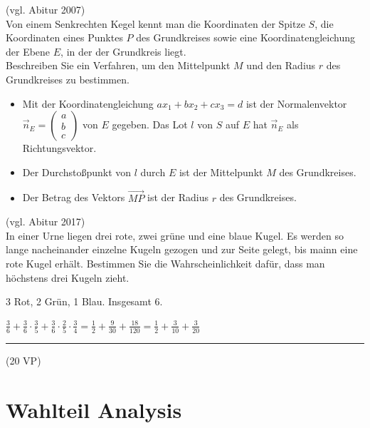  (vgl. Abitur 2007)\\
Von einem Senkrechten Kegel kennt man die Koordinaten der Spitze $S$, die Koordinaten eines Punktes $P$ des Grundkreises sowie eine Koordinatengleichung der Ebene $E$, in der der Grundkreis liegt.
\\Beschreiben Sie ein Verfahren, um den Mittelpunkt $M$ und den Radius $r$ des Grundkreises zu bestimmen.

\begin{lsg}{}
\begin{itemize}
  \item Mit der Koordinatengleichung $ax_1+bx_2+cx_3=d$ ist der Normalenvektor $\vec n_E=\left(\begin{array}{c}a\\b\\c\end{array}\right)$ von $E$ gegeben.
  Das Lot $l$ von $S$ auf $E$ hat $\vec n_E$ als Richtungsvektor.
  \item Der Durchstoßpunkt von $l$ durch $E$ ist der Mittelpunkt $M$ des Grundkreises.
  \item Der Betrag des Vektors $\overrightarrow{MP}$ ist der Radius $r$ des Grundkreises.
\end{itemize}
\end{lsg}

 (vgl. Abitur 2017)\\
In einer Urne liegen drei rote, zwei grüne und eine blaue Kugel. Es werden so lange nacheinander einzelne Kugeln gezogen und zur Seite gelegt, bis mainn eine rote Kugel erhält. Bestimmen Sie die Wahrscheinlichkeit dafür, dass man höchstens drei Kugeln zieht. 
\begin{lsg}{}
3 Rot, 2 Grün, 1 Blau. Insgesamt 6.

$\frac 3 6 + \frac 3 6 \cdot\frac 3 5 + \frac 3 6 \cdot \frac 2 5 \cdot \frac 3 4 = \frac 1 2+\frac{9}{30} +\frac{18}{120}=\frac 1 2 + \frac{3}{10}+  \frac{3}{20}$
\end{lsg}

\vfill

\hfill\rule{1.5cm}{0.4mm}

\hfill (20 VP)\hspace{0.22cm}







\section{Wahlteil Analysis}

